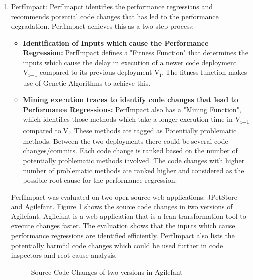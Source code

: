 \documentclass[article,type=msc,colorback,12pt,accentcolor=tud8b,table]{tudthesis}
\begin{document}
	 \begin{enumerate}
	 \item{PerfImpact:} 
	 PerfImapct identifies the performance regressions and recommends potential code changes that has led to the performance degradation. PerfImpact achieves this as a two step-process: 
	 
	 \begin{itemize}
\item{\textbf{Identification of Inputs which cause the Performance Regression:}} 
\newline
PerfImpact defines a "Fitness Function" that determines the inputs which cause the delay in execution of a newer code deployment V\textsubscript{i+1} compared to its previous deployment V\textsubscript{i}. The fitness function makes use of Genetic Algorithms to achieve this. 
 
\item {\textbf{Mining execution traces to identify code changes that lead to Performance Regressions:}} 
\newline
PerfImpact also has a "Mining Function", which identifies those methods which take a longer execution time in V\textsubscript{i+1} compared to V\textsubscript{i}. These methods are tagged as Potentially problematic methods. Between the two deployments there could be several code changes/commits. Each code change is ranked based on the number of potentially problematic methods involved. The code changes with higher number of problematic methods are ranked higher and considered as the possible root cause for the performance regression. 	 
	 
	 \end{itemize}
	
PerfImpact was evaluated on two open source web applications: JPetStore\cite{Jpetstore} and Agilefant\cite{Agilefant}. Figure \ref{fig:agilefant}  shows the source code changes in two versions of Agilefant. Agilefant is a web application that is a lean transformation tool to execute changes faster. The evaluation shows that the inputs which cause performance regressions are identified efficiently. PerfImpact also lists the potentially harmful code changes which could be used further in code inspectors and root cause analysis.

 \begin{figure}
 \begin{center}
  \makebox[\textwidth]{\texttt{[image: B1]}}
  \makebox[\textwidth]{\texttt{[image: B2]}}
\end{center}
\caption{Source Code Changes of two versions in Agilefant \cite{luo2016mining}}
\label{fig:agilefant}
\end{figure}



\end{enumerate}
\end{document}
